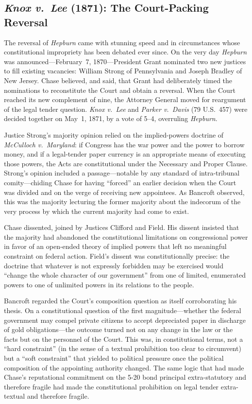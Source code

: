 \documentclass[12pt]{article}
\begin{document}
\subsection{\textit{Knox v.\ Lee} (1871): The Court-Packing Reversal}

The reversal of \textit{Hepburn} came with stunning speed and in
circumstances whose constitutional impropriety has been debated ever
since.  On the very day \textit{Hepburn} was announced---February~7,
1870---President Grant nominated two new justices to fill existing
vacancies: William Strong of Pennsylvania and Joseph Bradley of New
Jersey.  Chase believed, and said, that Grant had deliberately timed
the nominations to reconstitute the Court and obtain a reversal.  When
the Court reached its new complement of nine, the Attorney General moved
for reargument of the legal tender question.  \textit{Knox v.\ Lee} and
\textit{Parker v.\ Davis} (79 U.S.\ 457) were decided together on
May~1, 1871, by a vote of 5--4, overruling \textit{Hepburn}.

Justice Strong's majority opinion relied on the implied-powers doctrine
of \textit{McCulloch v.\ Maryland}: if Congress has the war power and
the power to borrow money, and if a legal-tender paper currency is an
appropriate means of executing those powers, the Acts are constitutional
under the Necessary and Proper Clause.  Strong's opinion included a
passage---notable by any standard of intra-tribunal
comity---chiding Chase for having ``forced'' an earlier decision when
the Court was divided and on the verge of receiving new appointees.
As Bancroft observed, this was the majority lecturing the former
majority about the indecorum of the very process by which the current
majority had come to exist.

Chase dissented, joined by Justices Clifford and Field.  His dissent
insisted that the majority had abandoned the constitutional limitations
on congressional power in favor of an open-ended theory of implied
powers that left no meaningful constraint on federal action.  Field's
dissent was constitutionally precise:
the doctrine that whatever is not expressly forbidden may be exercised
would ``change the whole character of our government'' from one of
limited, enumerated powers to one of unlimited powers in its relations
to the people.

Bancroft regarded the Court's composition question as itself
corroborating his thesis.  On a constitutional question of the first
magnitude---whether the federal government may compel private citizens
to accept depreciated paper in discharge of gold obligations---the
outcome turned not on any change in the law or the facts but on the
personnel of the Court.  This was, in constitutional terms, not a
``hard constraint'' (in the sense of a textual prohibition too clear
to circumvent) but a ``soft constraint'' that yielded to political
pressure once the political composition of the appointing authority
changed.  The same logic that had made Chase's reputational commitment
on the 5-20 bond principal extra-statutory and therefore fragile had
made the constitutional prohibition on legal tender extra-textual and
therefore fragile.
\end{document}
